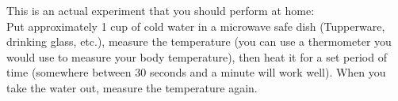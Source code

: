 \label{FNT1.2.1-5}







This is an actual experiment that you should perform at home:\\

\noindent Put approximately 1 cup of cold water in a microwave safe dish (Tupperware, drinking glass, etc.), measure the temperature (you can use a thermometer you would use to measure your body temperature), then heat it for a set period of time (somewhere between 30 seconds and a minute will work well). When you take the water out, measure the temperature again.

